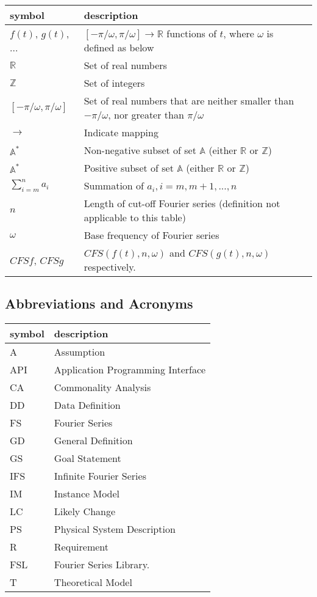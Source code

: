 \documentclass[12pt]{article}
\newcommand{\famname}{FSL} %
\begin{document}
\renewcommand{\arraystretch}{1.2}
\noindent \begin{longtable*}{l l p{12cm}} \toprule
\textbf{symbol} & \textbf{description}\\
\midrule 
$f(t)$, $g(t)$, ... & $[-\pi/\omega, \pi/\omega]\rightarrow\mathbb{R}$ functions of $t$, where $\omega$ is defined as below\\
$\mathbb{R}$ & Set of real numbers\\
$\mathbb{Z}$ & Set of integers\\
$[-\pi/\omega, \pi/\omega]$ & Set of real numbers that are neither smaller than $-\pi/\omega$, nor greater than $\pi/\omega$ \\
$\rightarrow$ & Indicate mapping\\
$\mathbb{A}^{*}$ & Non-negative subset of set $\mathbb{A}$ (either $\mathbb{R}$ or $\mathbb{Z}$)\\
$\mathbb{A}^{*}$ & Positive subset of set $\mathbb{A}$ (either $\mathbb{R}$ or $\mathbb{Z}$)\\
$\sum_{i=m}^{n}a_i$ & Summation of $a_i, i=m, m+1, ..., n$\\
$n$ & Length of cut-off Fourier series (definition not applicable to this table) \\ 
$\omega$ & Base frequency of Fourier series \\
$\mathit{CFSf}$, $\mathit{CFSg}$ & $\mathit{CFS}(f(t), n, \omega)$ and $\mathit{CFS}(g(t), n, \omega)$ respectively.\\
\bottomrule
\end{longtable*}

\subsection{Abbreviations and Acronyms}

\renewcommand{\arraystretch}{1.2}
\begin{tabular}{l l} 
  \toprule		
  \textbf{symbol} & \textbf{description}\\
  \midrule 
  A & Assumption\\
  API & Application Programming Interface\\
  CA & Commonality Analysis\\
  DD & Data Definition\\
  FS & Fourier Series\\
  GD & General Definition\\
  GS & Goal Statement\\
  IFS & Infinite Fourier Series\\
  IM & Instance Model\\
  LC & Likely Change\\
  PS & Physical System Description\\
  R & Requirement\\
  \famname{} & Fourier Series Library.\\
  T & Theoretical Model\\
  \bottomrule
\end{tabular}\\
\end{document}

